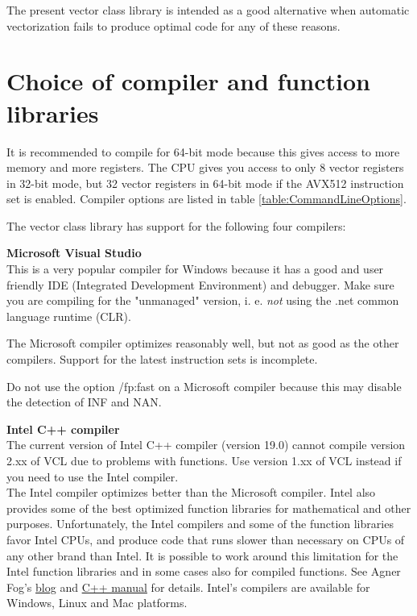 \documentclass[vcl_manual.tex]{subfiles}
\begin{document}
The present vector class library is intended as a good alternative when automatic vectorization fails to produce optimal code for any of these reasons.


\section{Choice of compiler and function libraries}\label{ChoiceOfCompiler}

It is recommended to compile for 64-bit mode because this gives access to more memory and more registers. The CPU gives you access to only 8 vector registers in 32-bit mode, but 32 vector registers in 64-bit mode if the AVX512 instruction set is enabled. Compiler options are listed in table \ref{table:CommandLineOptions}.

The vector class library has support for the following four compilers:

\textbf{Microsoft Visual Studio}\\
This is a very popular compiler for Windows because it has a good and user friendly IDE (Integrated Development Environment) and debugger. Make sure you are compiling for the "unmanaged" version, i. e. \emph{not} using the .net common language runtime (CLR).

The Microsoft compiler optimizes reasonably well, but not as good as the other compilers. Support for the latest instruction sets is incomplete.

Do not use the option /fp:fast on a Microsoft compiler because
this may disable the detection of INF and NAN.


\textbf{Intel C++ compiler}\\
The current version of Intel C++ compiler (version 19.0) cannot compile version 2.xx of VCL due to problems with  functions. Use version 1.xx of VCL instead if you need to use the Intel compiler.\\
The Intel compiler optimizes better than the Microsoft compiler. Intel also provides some of the best optimized function libraries for mathematical and other purposes. Unfortunately, the Intel compilers and some of the function libraries favor Intel CPUs, and produce code that runs slower than necessary on CPUs of any other brand than Intel. It is possible to work around this limitation for the Intel function libraries and in some cases also for compiled functions. 
See Agner Fog's \href{https://www.agner.org/optimize/blog/read.php?i=49}{blog} 
and \href{https://www.agner.org/optimize/#manual_cpp}{C++ manual} 
for details. Intel's compilers are available for Windows, Linux and Mac platforms.
\end{document}
